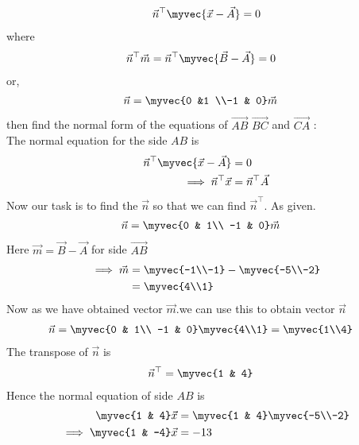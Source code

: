 \documentclass[11pt]{book}
\begin{document}
\begin{enumerate}[label=\thesection.\arabic*.,ref=\thesection.\theenumi]
\begin{align}
\vec{n}^{\top}\myvec{\vec{x}-\vec{A}}=0
\end{align}
where
\begin{align}
\vec{n}^{\top}\vec{m}&=\vec{n}^{\top}\myvec{\vec{B}-\vec{A}}=0
\end{align} 
or,\begin{align}
\vec{n}&=\myvec{0 &1 \\-1 & 0}\vec{m}
\end{align}
then find the normal form of the equations of $\vec{AB}$ $\vec{BC}$ and $\vec{CA}$
\solution:\\
       The normal equation for the side $AB$ is
\begin{align}
\vec{n}^{\top}\myvec{\vec{x}-\vec{A}}&=0\\
\implies
\vec{n}^{\top}\vec{x}&=\vec{n}^{\top}\vec{A}
\end{align}
Now our task is to find the $\vec{n}$ so that we can find $\vec{n}^{\top}$.
As given. 
\begin{align}
  \vec{n} &= \myvec{0 & 1\\
  -1 & 0}\vec{m}
\end{align}
Here $\vec{m} = \vec{B}- \vec{A}$ for side $\vec{AB}$
\begin{align}
\implies
\vec{m}&=\myvec{-1\\-1} - \myvec{-5\\-2}\\
&=\myvec{4\\1}
\end{align}
Now as we have obtained vector $\vec{m}$.we can use this to obtain vector $\vec{n}$
\begin{align}
\vec{n} &= \myvec{0 & 1\\
  -1 & 0}\myvec{4\\1}
 = \myvec{1\\4}
\end{align}
The transpose of $\vec{n}$ is
\begin{align}
  \vec{n}^{\top}&=\myvec{1 & 4}
\end{align}
Hence the normal equation of side $AB$ is 
\begin{align}
    \myvec{1 & 4}\vec{x}&=\myvec{1 & 4}\myvec{-5\\-2}\\
    \implies \myvec{1 & -4}\vec{x} &= -13
\end{align}
\begin{figure}[H]

\end{figure}
\end{enumerate}
\end{document}
